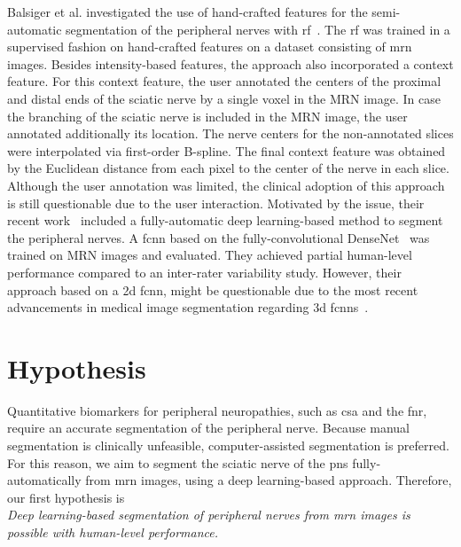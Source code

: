 Balsiger et al. investigated the use of hand-crafted features for the semi-automatic segmentation of the peripheral nerves with \gls{rf}~\cite{Balsiger2018Semi-automaticNeurography}. The \gls{rf} was trained in a supervised fashion on hand-crafted features on a dataset consisting of \gls{mrn} images. Besides intensity-based features, the approach also incorporated a context feature. For this context feature, the user annotated the centers of the proximal and distal ends of the sciatic nerve by a single voxel in the MRN image. In case the branching of the sciatic nerve is included in the MRN image, the user annotated additionally its location. The nerve centers for the non-annotated slices were interpolated via first-order B-spline. The final context feature was obtained by the Euclidean distance from each pixel to the center of the nerve in each slice. Although the user annotation was limited, the clinical adoption of this approach is still questionable due to the user interaction. Motivated by the issue, their recent work~\cite{Balsiger2018SegmentationApproach} included a fully-automatic deep learning-based method to segment the peripheral nerves. A \gls{fcnn} based on the fully-convolutional DenseNet~\cite{Huang2017DenselyNetworks} was trained on MRN images and evaluated. They achieved partial human-level performance compared to an inter-rater variability study. However, their approach based on a \gls{2d} \gls{fcnn}, might be questionable due to the most recent advancements in medical image segmentation regarding \gls{3d} \gls{fcnn}s~\cite{Cicek20163DAnnotation,Baumgartner2017AnSegmentation,Oktay2018AnatomicallySegmentation,Tetteh2018DeepVesselNet:Volumes}.\\

\section{Hypothesis} %
Quantitative biomarkers for peripheral neuropathies, such as \gls{csa} and the \gls{fnr}, require an accurate segmentation of the peripheral nerve. Because manual segmentation is clinically unfeasible, computer-assisted segmentation is preferred.
For this reason, we aim to segment the sciatic nerve of the \gls{pns} fully-automatically from \acrshort{mrn} images, using a deep learning-based approach. Therefore, our first hypothesis is\\

\textit{Deep learning-based segmentation of peripheral nerves from \gls{mrn} images is possible with human-level performance.} \\

